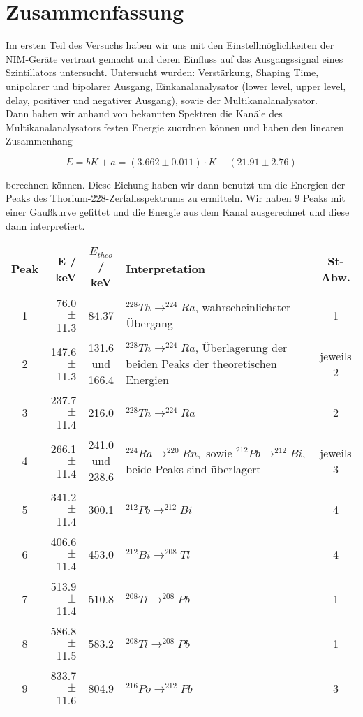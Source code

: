 \section{Zusammenfassung}

Im ersten Teil des Versuchs haben wir uns mit den Einstellmöglichkeiten der NIM-Geräte vertraut gemacht und deren Einfluss auf das Ausgangssignal eines Szintillators untersucht. Untersucht wurden: Verstärkung, Shaping Time, unipolarer und bipolarer Ausgang, Einkanalanalysator (lower level, upper level, delay, positiver und negativer Ausgang), sowie der Multikanalanalysator.\\

Dann haben wir anhand von bekannten Spektren die Kanäle des Multikanalanalysators festen Energie zuordnen können und haben den linearen Zusammenhang

$$E = bK + a = (3.662 \pm 0.011)\cdot K - (21.91 \pm 2.76)$$

berechnen können. Diese Eichung haben wir dann benutzt um die Energien der Peaks des Thorium-228-Zerfallsspektrums zu ermitteln. Wir haben 9 Peaks mit einer Gaußkurve gefittet und die Energie aus dem Kanal ausgerechnet und diese dann interpretiert.

\begin{center}
\begin{tabular}{| c | r | c | p{6cm} | c |} \hline
Peak & E / keV & $E_{theo}$ / keV & Interpretation &St-Abw. \\ \hline
1 & 76.0 $\pm$ 11.3  & 84.37 & $^{228}Th \rightarrow ^{224}Ra$, wahrscheinlichster Übergang & 1 \\
2 & 147.6 $\pm$ 11.3 & 131.6 und 166.4 & $^{228}Th \rightarrow ^{224}Ra$, Überlagerung der beiden Peaks der theoretischen Energien & jeweils 2\\
3 & 237.7 $\pm$ 11.4 & 216.0 & $^{228}Th \rightarrow ^{224}Ra$ & 2\\
4 & 266.1 $\pm$ 11.4 & 241.0 und 238.6 & $^{224}Ra \rightarrow ^{220}Rn, \text{\ \ sowie \ \ } ^{212}Pb \rightarrow ^{212}Bi$, beide Peaks sind überlagert & jeweils 3\\
5 & 341.2 $\pm$ 11.4 & 300.1 & $^{212}Pb \rightarrow ^{212}Bi$ & 4\\
6 & 406.6 $\pm$ 11.4 & 453.0 & $^{212}Bi \rightarrow ^{208}Tl$ & 4\\
7 & 513.9 $\pm$ 11.4 & 510.8 & $^{208}Tl \rightarrow ^{208}Pb$ & 1\\
8 & 586.8 $\pm$ 11.5 & 583.2 & $^{208}Tl \rightarrow ^{208}Pb$ & 1\\
9 & 833.7 $\pm$ 11.6 & 804.9 & $^{216}Po \rightarrow ^{212}Pb$ & 3\\ \hline
\end{tabular}
\end{center}

